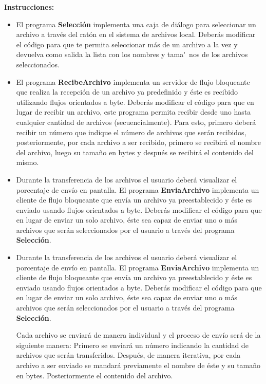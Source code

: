 \documentclass[12pt,twoside]{article}
\begin{document}
\textbf{Instrucciones: }

\begin{itemize}
    \item El programa \textbf{Selecci\'on} implementa una caja de di\'alogo para seleccionar un archivo a trav\'es del rat\'on en el sistema de archivos local. Deber\'as modificar el c\'odigo para que te permita seleccionar m\'as de un archivo a la vez y devuelva como salida la lista con los nombres y tama\'~nos de los archivos seleccionados.
    
    \item El programa \textbf{RecibeArchivo} implementa un servidor de flujo bloqueante que realiza la recepci\'on de un archivo ya predefinido y \'este es recibido utilizando flujos orientados a byte. Deber\'as modificar el c\'odigo para que en lugar de recibir un archivo, este programa permita recibir desde uno hasta cualquier cantidad de archivos
(secuencialmente). Para esto, primero deber\'a recibir un n\'umero que indique el n\'umero de archivos que ser\'an recibidos, posteriormente, por cada archivo a ser recibido, primero se recibir\'a el nombre del archivo, luego su tama\~no en bytes y despu\'es se recibir\'a el contenido del mismo.

    \item Durante la transferencia de los archivos el usuario deber\'a visualizar el porcentaje de env\'io en pantalla. El programa \textbf{EnviaArchivo} implementa un cliente de flujo bloqueante que envía un archivo ya preestablecido y \'este es enviado usando flujos orientados a byte. Deber\'as modificar el c\'odigo para que en lugar de enviar un
solo archivo, \'este sea capaz de enviar uno o m\'as archivos que ser\'an seleccionados por el usuario a trav\'es del programa \textbf{Selecci\'on}. 

    \item Durante la transferencia de los archivos el usuario deber\'a visualizar el porcentaje de env\'io en pantalla. El programa \textbf{EnviaArchivo} implementa un cliente de flujo bloqueante que envía un archivo ya preestablecido y \'este es enviado usando flujos orientados a byte. Deber\'as modificar el c\'odigo para que en lugar de enviar un
solo archivo, \'este sea capaz de enviar uno o m\'as archivos que ser\'an seleccionados por el usuario a trav\'es del programa \textbf{Selecci\'on}. 

\newpage

Cada archivo se enviar\'a de manera individual y el proceso de envío ser\'a de la siguiente
manera: 
\newline
Primero se enviar\'a un n\'umero indicando la cantidad de archivos que ser\'an transferidos. 
\newline 
Despu\'es, de manera iterativa, por cada archivo a ser enviado se mandar\'a previamente el nombre de \'este y su tamaño en bytes.
\newline
Posteriormente el contenido del archivo.


\end{itemize}
\end{document}
